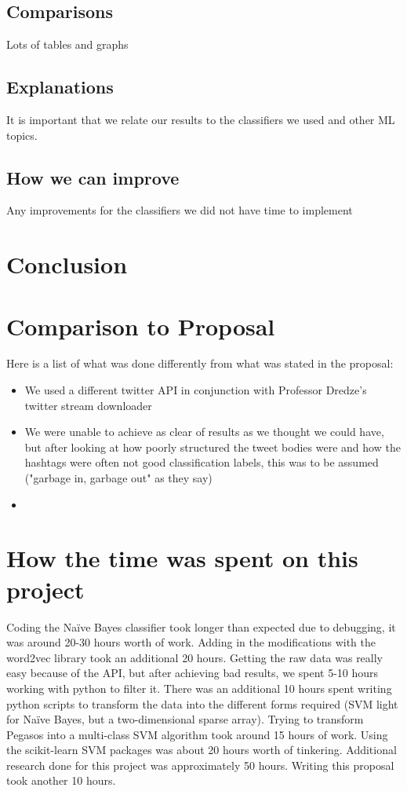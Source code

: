 \documentclass[11pt,letterpaper]{article}
\begin{document}
\subsection{Comparisons}
Lots of tables and graphs

\subsection{Explanations}
It is important that we relate our results  to the classifiers we used and other ML topics.

\subsection{How we can improve}
Any improvements for the classifiers we did not have time to implement

\section{Conclusion}

\section*{Comparison to Proposal}
 Here is a list of what was done differently from what was stated in the proposal:
\begin{itemize}
\item We used a different twitter API in conjunction with Professor Dredze's twitter stream downloader
\item We were unable to achieve as clear of results as we thought we could have, but after looking at how poorly structured the tweet bodies were and how the hashtags were often not good classification labels, this was to be assumed ("garbage in, garbage out" as they say)
\item
\end{itemize}

\section*{How the time was spent on this project}
Coding the Na{\"i}ve Bayes classifier took longer than expected due to debugging, it was around 20-30 hours worth of work. Adding in the modifications with the word2vec library took an additional 20 hours. Getting the raw data was really easy because of the API, but after achieving bad results, we spent 5-10 hours working with python to filter it. There was an additional 10 hours spent writing python scripts to transform the data into the different forms required (SVM light for Na{\"i}ve Bayes, but a two-dimensional sparse array). Trying to transform Pegasos into a multi-class SVM algorithm took around 15 hours of work. Using the scikit-learn SVM packages was about 20 hours worth of tinkering. Additional research done for this project was approximately 50 hours. Writing this proposal took another 10 hours.
\end{document}
